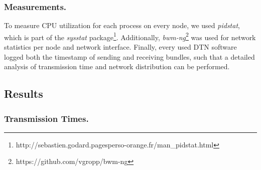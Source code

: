
\subsubsection{Measurements.}
To measure CPU utilization for each process on every node, we used \textit{pidstat}, which is part of the \textit{sysstat} package\footnote{http://sebastien.godard.pagesperso-orange.fr/man\_pidstat.html}.
Additionally, \textit{bwm-ng}\footnote{https://github.com/vgropp/bwm-ng} was used for network statistics per node and network interface.
Finally, every used DTN software logged both the timestamp of sending and receiving bundles, such that a detailed analysis of transmission time and network distribution can be performed.


\subsection{Results}

\subsubsection{Transmission Times.}
\label{penning2019dtn7:subsub:transmission_time}

